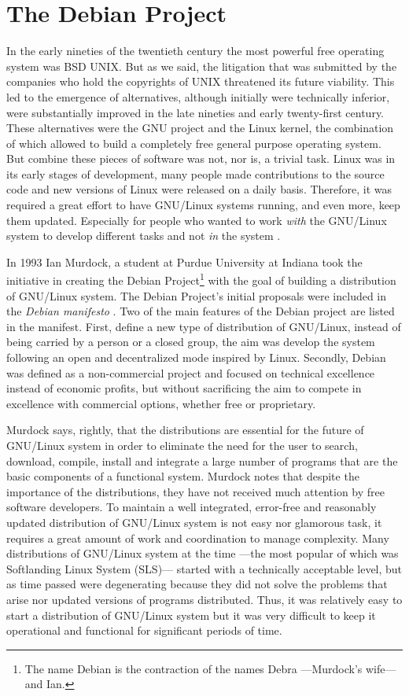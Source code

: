 \section{The Debian Project}

In the early nineties of the twentieth century the most powerful free operating system was BSD UNIX. But as we said, the litigation that was submitted by the companies who hold the copyrights of UNIX 
threatened its future viability. This led to the emergence of alternatives, although initially were technically inferior, were substantially improved in the late nineties and early twenty-first century. These alternatives were the GNU project and the Linux kernel, the combination of which allowed to build a completely free general purpose operating system. But combine these pieces of software was not, nor is, a trivial task. Linux was in its early stages of development, many people made contributions to the source code and new versions of Linux were released on a daily basis. Therefore, it was required a great effort to have GNU/Linux systems running, and even more, keep them updated. Especially for people who wanted to work \emph{with} the GNU/Linux system to develop different tasks and not \emph{in} the system \citep[30]{krafft:2005}.

In 1993 Ian Murdock, a student at Purdue University at Indiana took the initiative in creating the Debian Project\footnote{The name Debian is the contraction of the names Debra ---Murdock's wife--- and Ian.} with the goal of building a distribution of GNU/Linux system. The Debian Project's initial proposals were included in the \emph{Debian manifesto} \citep{murdock:1994}. Two of the main features of the Debian project are listed in the manifest. First, define a new type of distribution of GNU/Linux, instead of being carried by a person or a closed group, the aim was develop the system following an open and decentralized mode inspired by Linux. Secondly, Debian was defined as a non-commercial project and focused on technical excellence instead of economic profits, but without sacrificing the aim to compete in excellence with commercial options, whether free or proprietary.

Murdock says, rightly, that the distributions are essential for the future of GNU/Linux system in order to eliminate the need for the user to search, download, compile, install and integrate a large number of programs that are the basic components of a functional system. Murdock notes that despite the importance of the distributions, they have not received much attention by free software developers. To maintain a well integrated, error-free and reasonably updated distribution of GNU/Linux system is not easy nor glamorous task, it requires a great amount of work and coordination to manage complexity. Many distributions of GNU/Linux system at the time ---the most popular of which was Softlanding Linux System (SLS)--- started with a technically acceptable level, but as time passed were degenerating because they did not solve the problems that arise nor updated versions of programs distributed. Thus, it was relatively easy to start a distribution of GNU/Linux system but it was very difficult to keep it operational and functional for significant periods of time.

